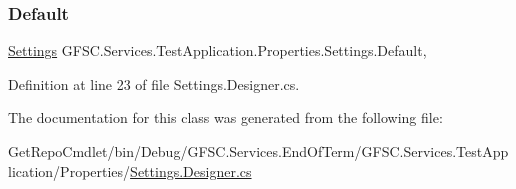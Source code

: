 \subsubsection{\texorpdfstring{Default}{Default}}
{\footnotesize\ttfamily \mbox{\hyperlink{class_g_f_s_c_1_1_services_1_1_test_application_1_1_properties_1_1_settings}{Settings}} G\+F\+S\+C.\+Services.\+Test\+Application.\+Properties.\+Settings.\+Default\hspace{0.3cm}{\ttfamily [static]}, {\ttfamily [get]}}



Definition at line 23 of file Settings.\+Designer.\+cs.



The documentation for this class was generated from the following file\+:\begin{DoxyCompactItemize}
\item 
Get\+Repo\+Cmdlet/bin/\+Debug/\+G\+F\+S\+C.\+Services.\+End\+Of\+Term/\+G\+F\+S\+C.\+Services.\+Test\+Application/\+Properties/\mbox{\hyperlink{_g_f_s_c_8_services_8_test_application_2_properties_2_settings_8_designer_8cs}{Settings.\+Designer.\+cs}}\end{DoxyCompactItemize}
